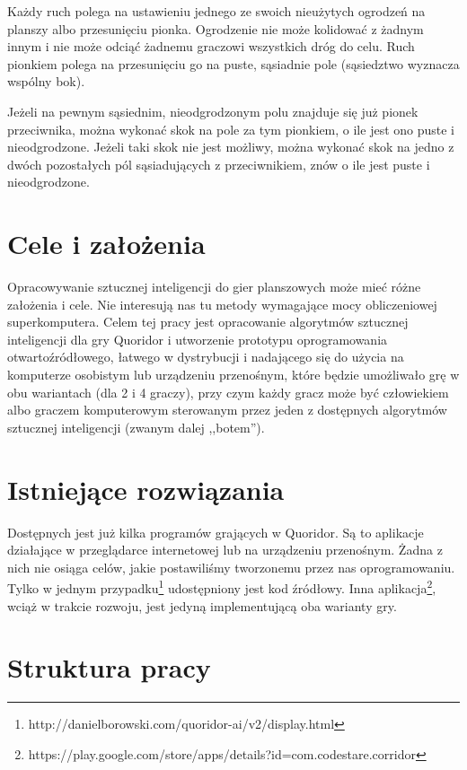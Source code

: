 \documentclass{pracamgr}
\begin{document}
Każdy ruch polega na ustawieniu jednego ze swoich nieużytych ogrodzeń na planszy albo przesunięciu pionka. Ogrodzenie nie może kolidować z żadnym innym i nie może odciąć żadnemu graczowi wszystkich dróg do celu. Ruch pionkiem polega na przesunięciu go na puste, sąsiadnie pole (sąsiedztwo wyznacza wspólny bok).

Jeżeli na pewnym sąsiednim, nieodgrodzonym polu znajduje się już pionek przeciwnika, można wykonać skok na pole za tym pionkiem, o ile jest ono puste i nieodgrodzone. Jeżeli taki skok nie jest możliwy, można wykonać skok na jedno z dwóch pozostałych pól sąsiadujących z przeciwnikiem, znów o ile jest puste i nieodgrodzone.

\section{Cele i założenia}

Opracowywanie sztucznej inteligencji do gier planszowych może mieć różne założenia i cele.
Nie interesują nas tu metody wymagające mocy obliczeniowej superkomputera.
Celem tej pracy jest opracowanie algorytmów sztucznej inteligencji dla gry Quoridor i utworzenie prototypu oprogramowania otwartoźródłowego, łatwego w dystrybucji i nadającego się do użycia na komputerze osobistym lub urządzeniu przenośnym, które będzie umożliwało grę w obu wariantach (dla 2 i 4 graczy), przy czym każdy gracz może być człowiekiem albo graczem komputerowym sterowanym przez jeden z dostępnych algorytmów sztucznej inteligencji (zwanym dalej ,,botem'').

\section{Istniejące rozwiązania}

Dostępnych jest już kilka programów grających w Quoridor. Są to aplikacje działające w przeglądarce internetowej lub na urządzeniu przenośnym. Żadna z nich nie osiąga celów, jakie postawiliśmy tworzonemu przez nas oprogramowaniu.
Tylko w jednym przypadku\footnote{http://danielborowski.com/quoridor-ai/v2/display.html} udostępniony jest kod źródłowy.
Inna aplikacja\footnote{https://play.google.com/store/apps/details?id=com.codestare.corridor}, wciąż w trakcie rozwoju, jest jedyną implementującą oba warianty gry.

\section{Struktura pracy}
\end{document}
